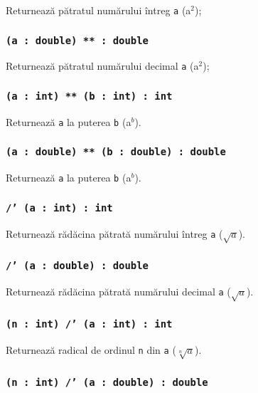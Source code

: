 Returnează pătratul numărului întreg \texttt{a} (a$^2$);

\subsubsection{\texttt{(a : double) ** : double}}

Returnează pătratul numărului decimal \texttt{a} (a$^2$);

\subsubsection{\texttt{(a : int) ** (b : int) : int}}

Returnează \texttt{a} la puterea \texttt{b} (a$^b$).

\subsubsection{\texttt{(a : double) ** (b : double) : double}}

Returnează \texttt{a} la puterea \texttt{b} (a$^b$).

\subsubsection{\texttt{/' (a : int) : int}}

Returnează rădăcina pătrată numărului întreg \texttt{a} ($\sqrt{a}$).

\subsubsection{\texttt{/' (a : double) : double}}

Returnează rădăcina pătrată numărului decimal \texttt{a} ($\sqrt{a}$).

\subsubsection{\texttt{(n : int) /' (a : int) : int}}

Returnează radical de ordinul \texttt{n} din \texttt{a} ($\sqrt[n]{a}$).

\subsubsection{\texttt{(n : int) /' (a : double) : double}}

